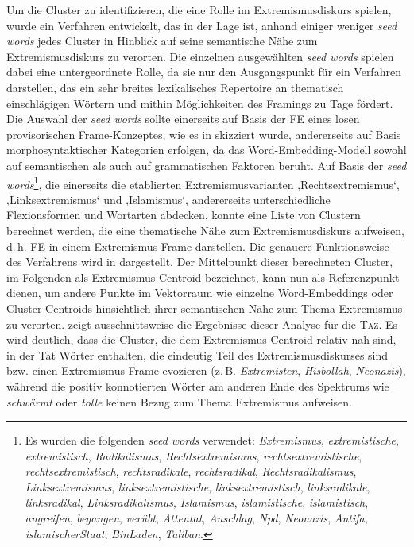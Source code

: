 Um die Cluster zu identifizieren, die eine Rolle im Extremismusdiskurs spielen, wurde ein Verfahren entwickelt, das in der Lage ist, anhand einiger weniger \emph{seed words} jedes Cluster in Hinblick auf seine semantische Nähe zum Extremismusdiskurs zu verorten. Die einzelnen ausgewählten \emph{seed words} spielen dabei eine untergeordnete Rolle, da sie nur den Ausgangspunkt für ein Verfahren darstellen, das ein sehr breites lexikalisches Repertoire an thematisch einschlägigen Wörtern und mithin Möglichkeiten des Framings zu Tage fördert. Die Auswahl der \emph{seed words} sollte einerseits auf Basis der FE eines losen provisorischen Frame-Konzeptes, wie es in  skizziert wurde, andererseits auf Basis morphosyntaktischer Kategorien erfolgen, da das Word-Embedding-Modell sowohl auf semantischen als auch auf grammatischen Faktoren beruht. Auf Basis der \emph{seed words}\footnote{Es wurden die folgenden \emph{seed words} verwendet: \emph{Extremismus}, \emph{extremistische}, \emph{extremistisch}, \emph{Radikalismus}, \emph{Rechtsextremismus}, \emph{rechtsextremistische}, \emph{rechtsextremistisch}, \emph{rechtsradikale}, \emph{rechtsradikal}, \emph{Rechtsradikalismus}, \emph{Linksextremismus}, \emph{linksextremistische}, \emph{linksextremistisch}, \emph{linksradikale}, \emph{linksradikal}, \emph{Linksradikalismus}, \emph{Islamismus}, \emph{islamistische}, \emph{islamistisch}, \emph{angreifen}, \emph{begangen}, \emph{verübt}, \emph{Attentat}, \emph{Anschlag}, \emph{Npd}, \emph{Neonazis}, \emph{Antifa}, \emph{islamischer}\cluster{\_}\emph{Staat}, \emph{Bin}\cluster{\_}\emph{Laden}, \emph{Taliban}.}, die einerseits die etablierten Extremismusvarianten ‚Rechtsextremismus`, ‚Linksextremismus` und ‚Islamismus`, andererseits unterschiedliche Flexionsformen und Wortarten abdecken, konnte eine Liste von Clustern berechnet werden, die eine thematische Nähe zum Extremismusdiskurs aufweisen, d.\,h. FE in einem Extremismus-Frame darstellen. Die genauere Funktionsweise des Verfahrens wird in  dargestellt. Der Mittelpunkt dieser berechneten Cluster, im Folgenden als Extremismus-Centroid bezeichnet, kann nun als Referenzpunkt dienen, um andere Punkte im Vektorraum wie einzelne Word-Embeddings oder Cluster-Centroids hinsichtlich ihrer semantischen Nähe zum Thema Extremismus zu verorten.  zeigt ausschnittsweise die Ergebnisse dieser Analyse für die \textsc{Taz}. Es wird deutlich, dass die Cluster, die dem Extremismus-Centroid relativ nah sind, in der Tat Wörter enthalten, die eindeutig Teil des Extremismusdiskurses sind bzw. einen Extremismus-Frame evozieren (z.\,B. \emph{Extremisten}, \emph{Hisbollah}, \emph{Neonazis}), während die positiv konnotierten Wörter am anderen Ende des Spektrums wie \emph{schwärmt} oder \emph{tolle} keinen Bezug zum Thema Extremismus aufweisen.


